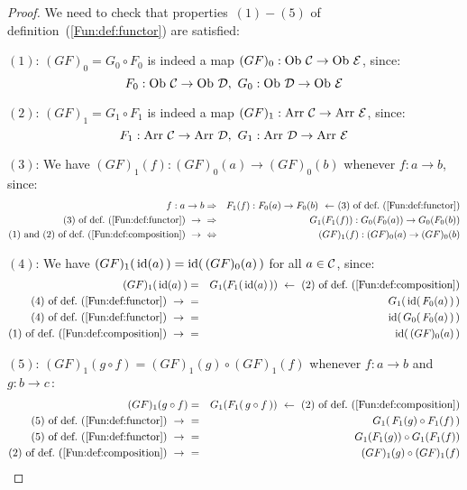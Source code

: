\begin{proof}
    We need to check that properties~$(1)-(5)$ of 
    definition~(\ref{Fun:def:functor}) are satisfied:

    $(1)$: $(GF)_{0}=G_{0}\circ F_{0}$ is indeed a map $(GF)_{0}:\mbox{\rm Ob}\ \mbox{$\cal C$}
    \to\mbox{\rm Ob}\ \mbox{$\cal E$}$, since: 
        \[
            F_{0}:\ob\ \Cat\to\ob\ \Dat,\  G_{0}:\ob\ \Dat\to\ob\ \Eat
        \]

    $(2)$: $(GF)_{1}=G_{1}\circ F_{1}$ is indeed a map $(GF)_{1}:\mbox{\rm Arr}\ \mbox{$\cal C$}
    \to\mbox{\rm Arr}\ \mbox{$\cal E$}$, since: 
        \[
            F_{1}:\arr\ \Cat\to\arr\ \Dat,\  G_{1}:\arr\ \Dat\to\arr\ \Eat
        \]

    $(3)$: We have $(GF)_{1}(f) : (GF)_{0}(a)\to(GF)_{0}(b)$ whenever $f:a\to b$, 
    since:
        \begin{eqnarray*}f:a\to b
            &\Rightarrow& F_{1}(f):F_{0}(a)\to F_{0}(b) 
            \mbox{\ \ $\leftarrow$\ $(3)$ of def.~(\ref{Fun:def:functor})}\\ 
            \mbox{$(3)$ of def.~(\ref{Fun:def:functor})}\ \to\ 
            &\Rightarrow& G_{1}(F_{1}(f)):G_{0}(F_{0}(a))\to G_{0}(F_{0}(b))\\
            \mbox{$(1)$ and $(2)$ of def.~(\ref{Fun:def:composition})}\ \to\ 
            &\Leftrightarrow& (GF)_{1}(f):(GF)_{0}(a)\to (GF)_{0}(b)
        \end{eqnarray*}

    $(4)$: We have $(GF)_{1}(\,\mbox{\rm id}(a)\,)=\mbox{\rm id}(\,(GF)_{0}(a)\,)$ for all
    $a\in\mbox{$\cal C$}$, since:
        \begin{eqnarray*}(GF)_{1}(\,\id(a)\,)
            &=&G_{1}(F_{1}(\,\id(a)\,))
            \ \leftarrow\ \mbox{$(2)$ of def.~(\ref{Fun:def:composition})}\\
            \mbox{$(4)$ of def.~(\ref{Fun:def:functor})}\ \to\ 
            &=&G_{1}(\,\id(\,F_{0}(a)\,)\,)\\
            \mbox{$(4)$ of def.~(\ref{Fun:def:functor})}\ \to\ 
            &=&\id(\,G_{0}(\,F_{0}(a)\,)\,)\\
            \mbox{$(1)$ of def.~(\ref{Fun:def:composition})}\ \to\ 
            &=&\id(\,(GF)_{0}(a)\,)\\
        \end{eqnarray*}

    $(5)$: $(GF)_{1}(g\circ f)=(GF)_{1}(g)\circ (GF)_{1}(f)$ whenever $f:a\to b$
    and $g:b\to c$\,:
        \begin{eqnarray*}(GF)_{1}(g\circ f)
            &=&G_{1}(F_{1}(\,g\circ f\,))
            \ \leftarrow\ \mbox{$(2)$ of def.~(\ref{Fun:def:composition})}\\
            \mbox{$(5)$ of def.~(\ref{Fun:def:functor})}\ \to\ 
            &=&G_{1}(\,F_{1}(g)\circ F_{1}(f)\,)\\
            \mbox{$(5)$ of def.~(\ref{Fun:def:functor})}\ \to\ 
            &=&G_{1}(F_{1}(g))\circ G_{1}(F_{1}(f))\\
            \mbox{$(2)$ of def.~(\ref{Fun:def:composition})}\ \to\ 
            &=&(GF)_{1}(g)\circ (GF)_{1}(f)\\
        \end{eqnarray*}
\end{proof}

